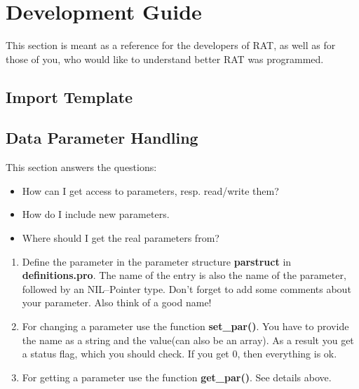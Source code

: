 \chapter{Development Guide}

This section is meant as a reference for the developers of RAT, as well as for
those of you, who would like to understand better RAT was programmed.


\section{Import Template}

\section{Data Parameter Handling}
This section answers the questions:
\begin{itemize}
  \item How can I get access to parameters, resp. read/write them?
  \item How do I include new parameters.
  \item Where should I get the real parameters from?
\end{itemize}

\begin{enumerate}
  \item Define the parameter in the parameter structure \textbf{parstruct} in
    \textbf{definitions.pro}. The name of the entry is also the name of the
    parameter, followed by an NIL--Pointer type. Don't forget to add some
    comments about your parameter. Also think of a good name!
  \item For changing a parameter use the function \textbf{set\_par()}. You have to
    provide the name as a string and the value(can also be an array). As a
    result you get a status flag, which you should check. If you get 0, then
    everything is ok.
  \item For getting a parameter use the function \textbf{get\_par()}. See details above.
\end{enumerate}


